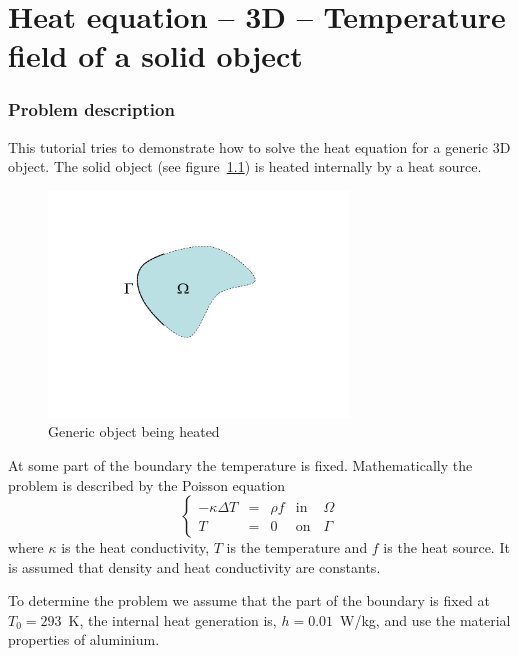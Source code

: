 \chapter{Heat equation -- 3D -- Temperature field of a solid object}



\subsection*{Problem description}

This tutorial tries to demonstrate how to solve the heat equation 
for a generic 3D object. The solid object 
(see figure~\ref{fg:object1}) is heated internally by a heat source.
\begin{figure}
\begin{center}
\includegraphics[width=80mm, viewport=100 100 760 520,clip]{domain}
\caption{Generic object being heated}\label{fg:object1}
\end{center}
\end{figure}
At some part of the boundary the temperature is fixed.
Mathematically the problem is described by the Poisson equation
\begin{equation}
\left \{
\begin{array}{ccccc}
- \kappa \Delta T &= &\rho f & \mathrm{ in } \, \, & \Omega \\
T&=&0 & \mathrm{ on } & \Gamma
\end{array}
\right .
\end{equation}
where $\kappa$ is the heat conductivity, $T$  is the temperature 
and $f$ is the heat source. It is assumed that density 
and heat conductivity are constants. 

To determine the problem we assume that the part of the boundary is fixed at $T_0=293$~K,
the internal heat generation is, $h=0.01$~W/kg, and use the material properties of aluminium.


